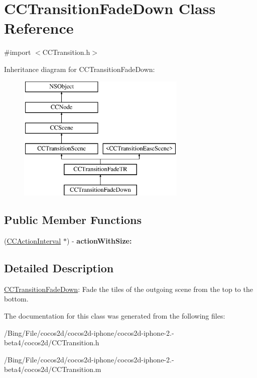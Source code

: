 \hypertarget{interface_c_c_transition_fade_down}{\section{C\-C\-Transition\-Fade\-Down Class Reference}
\label{interface_c_c_transition_fade_down}
}


{\ttfamily \#import $<$C\-C\-Transition.\-h$>$}

Inheritance diagram for C\-C\-Transition\-Fade\-Down\-:\begin{figure}[H]
\begin{center}
\leavevmode
\includegraphics[height=6.000000cm]{interface_c_c_transition_fade_down}
\end{center}
\end{figure}
\subsection*{Public Member Functions}
\begin{DoxyCompactItemize}
\item 
\hypertarget{interface_c_c_transition_fade_down_a612268d4bf64a2ee8b95849f559933cf}{(\hyperlink{class_c_c_action_interval}{C\-C\-Action\-Interval} $\ast$) -\/ {\bfseries action\-With\-Size\-:}}\label{interface_c_c_transition_fade_down_a612268d4bf64a2ee8b95849f559933cf}

\end{DoxyCompactItemize}


\subsection{Detailed Description}
\hyperlink{interface_c_c_transition_fade_down}{C\-C\-Transition\-Fade\-Down}\-: Fade the tiles of the outgoing scene from the top to the bottom. 

The documentation for this class was generated from the following files\-:\begin{DoxyCompactItemize}
\item 
/\-Bing/\-File/cocos2d/cocos2d-\/iphone/cocos2d-\/iphone-\/2.-\/beta4/cocos2d/C\-C\-Transition.\-h\item 
/\-Bing/\-File/cocos2d/cocos2d-\/iphone/cocos2d-\/iphone-\/2.-\/beta4/cocos2d/C\-C\-Transition.\-m\end{DoxyCompactItemize}
